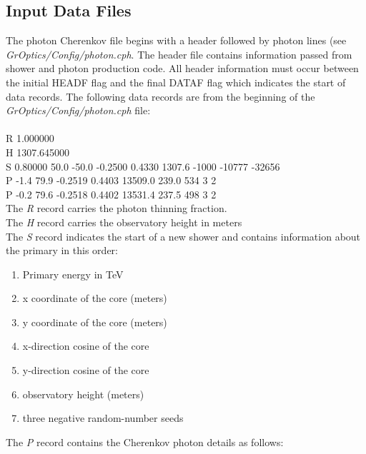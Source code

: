 \documentclass{article}
\begin{document}
\subsection{Input Data Files}\label{SS:INDATA}
The photon Cherenkov file begins with a header followed
by photon lines (see \emph{GrOptics/Config/photon.cph}.  The header file contains information 
passed from shower and photon production code. All header information must occur between the 
initial HEADF flag and the final DATAF flag which indicates the start of data records.  
The following data records are from the beginning of the 
\emph{GrOptics/Config/photon.cph} file:
\\ \\
\noindent
R 1.000000       \\
H 1307.645000 \\
S 0.80000 50.0 -50.0 -0.2500 0.4330 1307.6 -1000 -10777 -32656 \\ 
P -1.4 79.9 -0.2519 0.4403 13509.0 239.0 534 3 2 \\
P -0.2 79.6 -0.2518 0.4402 13531.4 237.5 498 3 2 \\
\noindent
The \emph{R} record carries the photon thinning fraction. \\
The \emph{H} record carries the observatory height in meters \\
The \emph{S} record indicates the start of a new shower and contains information 
about the primary in this order:
\begin{enumerate}
 \setlength{\itemsep}{0cm}%
 \setlength{\parskip}{0cm}%
 
\item  Primary energy in TeV
\item x coordinate of the core (meters)
\item
  y coordinate of the core (meters)
\item
  x-direction cosine of the core
\item
  y-direction cosine of the core
\item
  observatory height (meters)
\item
  three negative random-number seeds 
  
\end{enumerate}

The \emph{P} record contains the Cherenkov photon details as follows:
\end{document}
